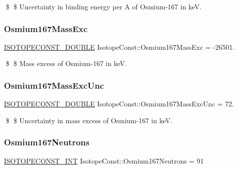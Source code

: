 \$ \$ Uncertainty in binding energy per A of Osmium-\/167 in keV. \mbox{\label{group___isotope_const-_osmium-_os167_ga6d39674abb665c2f035f9c712564eb70}} 
\subsubsection{\texorpdfstring{Osmium167\+Mass\+Exc}{Osmium167MassExc}}
{\footnotesize\ttfamily \mbox{\hyperlink{group___isotope_const-_macros_ga8f45a7272ce02c0b4c65c44636ed719a}{I\+S\+O\+T\+O\+P\+E\+C\+O\+N\+S\+T\+\_\+\+D\+O\+U\+B\+LE}} Isotope\+Const\+::\+Osmium167\+Mass\+Exc = -\/26501.}

\$ \$ Mass excess of Osmium-\/167 in keV. \mbox{\label{group___isotope_const-_osmium-_os167_ga14d38b9d82ecf18e00e17fc5a2d8b339}} 
\subsubsection{\texorpdfstring{Osmium167\+Mass\+Exc\+Unc}{Osmium167MassExcUnc}}
{\footnotesize\ttfamily \mbox{\hyperlink{group___isotope_const-_macros_ga8f45a7272ce02c0b4c65c44636ed719a}{I\+S\+O\+T\+O\+P\+E\+C\+O\+N\+S\+T\+\_\+\+D\+O\+U\+B\+LE}} Isotope\+Const\+::\+Osmium167\+Mass\+Exc\+Unc = 72.}

\$ \$ Uncertainty in mass excess of Osmium-\/167 in keV. \mbox{\label{group___isotope_const-_osmium-_os167_gac5f31c7cc15eaefefbb987ad016b1016}} 
\subsubsection{\texorpdfstring{Osmium167\+Neutrons}{Osmium167Neutrons}}
{\footnotesize\ttfamily \mbox{\hyperlink{group___isotope_const-_macros_ga5f18360b3e99483a35c32d789e62621c}{I\+S\+O\+T\+O\+P\+E\+C\+O\+N\+S\+T\+\_\+\+I\+NT}} Isotope\+Const\+::\+Osmium167\+Neutrons = 91}

